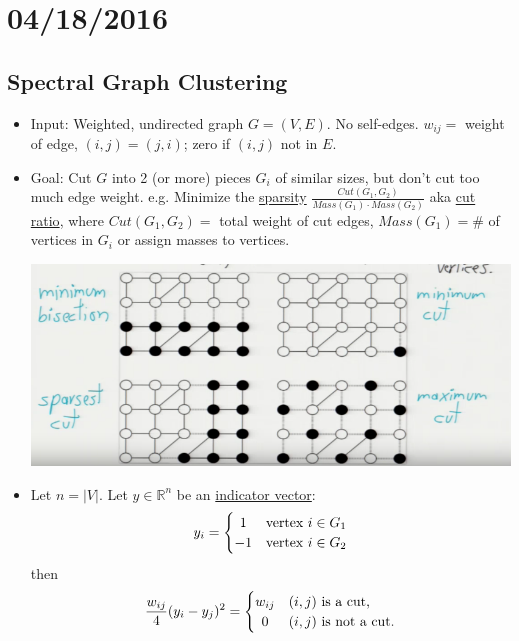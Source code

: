 \documentclass[10pt]{article}
\newcommand{\R}{\mathbb{R}}
\begin{document}
\section*{04/18/2016}
\subsection*{Spectral Graph Clustering}
\begin{itemize}
	\item Input: Weighted, undirected graph $G = (V, E)$. No self-edges. $w_{ij} = $ weight of edge, $(i,j) = (j,i)$; zero if $(i,j)$ not in $E$.
	\item Goal: Cut $G$ into 2 (or more) pieces $G_{i}$ of similar sizes, but don't cut too much edge weight. e.g. Minimize the \underline{sparsity} $\frac{Cut(G_{1}, G_{2})}{Mass(G_{1}) \cdot Mass(G_{2})}$  aka \underline{cut ratio}, where $Cut(G_{1}, G_{2}) = $ total weight of cut edges, $Mass(G_{1}) = $\# of vertices in $G_{i}$ or assign masses to vertices.
		\begin{center}
			\includegraphics[scale=0.5]{../images/cuts}
		\end{center}
	\item Let $n = |V|$. Let $y \in \R^{n}$ be an \underline{indicator vector}:
			\[
 				y_{i} = \left\{\def\arraystretch{1.2}%
 				\begin{array}{@{}c@{\quad}l@{}}
    				1 & \text{vertex } i \in G_{1} \\
    				-1 & \text{vertex } i \in G_{2} \\
  				\end{array}\right.
			\]
			then 
			\[
 				\frac{w_{ij}}{4}(y_{i} - y_{j})^{2} = \left\{\def\arraystretch{1.2}%
 				\begin{array}{@{}c@{\quad}l@{}}
    				w_{ij} & (i, j) \text{ is a cut,} \\
    				0 & (i, j) \text{ is not a cut.} \\
  				\end{array}\right.
\]
\end{itemize}
\end{document}

